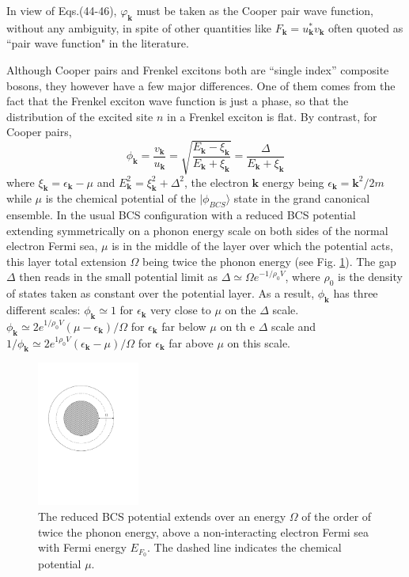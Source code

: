 \documentclass[twocolumn,showpacs]{revtex4}
\def\v#1{\mathbf{#1}}
\begin{document}
In view of Eqs.(44-46), $\varphi_{\v k}$ must be taken as the Cooper pair wave function, without any ambiguity, in spite of other quantities like $F_{\v k}=u_{\v k}^\ast v_{\v k}$ often quoted as ``pair wave function" in the literature. 

Although Cooper pairs and Frenkel excitons both are ``single index'' composite bosons, they however have a few major differences. One of them comes from the fact that the Frenkel exciton wave function is just a phase, so that the distribution of the  excited site $n$  in a Frenkel exciton is flat. By contrast, for Cooper pairs,
\begin{equation}\label{phi}
\phi_{\v k}=\frac{v_{\v k}}{u_{\v k}}=\sqrt{\frac{E_{\v k}-\xi_{\v k}}{E_{\v k}+\xi_{\v k}}}=\frac{\Delta}{E_{\v k}+\xi_{\v k}}
\end{equation}
where $\xi_{\v k}=\epsilon_{\v k}-\mu$ and $E_{\v k}^2=\xi_{\v k}^2+\Delta^2$, the electron $\v k$ energy being $\epsilon_{\v k}=\v k^2/2m$ while $\mu$ is the chemical potential of the $|\phi_{BCS}\rangle$ state in the grand canonical ensemble. In the usual BCS configuration with a reduced BCS potential extending symmetrically on a phonon energy scale on both sides of the normal electron Fermi sea, $\mu$ is in the middle of the layer over which the potential acts, this layer total extension $\Omega$ being twice the phonon energy (see Fig. \ref{potfig}). The gap $\Delta$ then reads in the small potential limit as $\Delta\simeq \Omega e^{-1/\rho_0V}$, where $\rho_0$ is the density of states taken as constant over the potential layer. As a result, $\phi_{\v k}$ has three different scales: $\phi_{\v k}\simeq 1$ for $\epsilon_{\v k}$ very close to $\mu$ on the $\Delta$ scale. $\phi_{\v k}\simeq 2e^{1/\rho_0V}(\mu-\epsilon_{\v k})/\Omega$ for $\epsilon_{\v k}$ far below $\mu$ on th
 e $\Delta$ scale and $1/\phi_{\v k}\simeq 2e^{1\rho_0V}(\epsilon_{\v k}-\mu)/\Omega$ for $\epsilon_{\v k}$ far above $\mu$ on this scale.
\begin{figure}[htbp]
\begin{center}
\includegraphics[width=0.3\textwidth]{potential}
\caption{The reduced BCS potential extends over an energy $\Omega$ of the order of twice the phonon energy, above a non-interacting electron Fermi sea with Fermi energy $E_{F_0}$.  The dashed line indicates the chemical potential $\mu$.  \label{potfig}} 

\end{center}
\end{figure}
\end{document}
